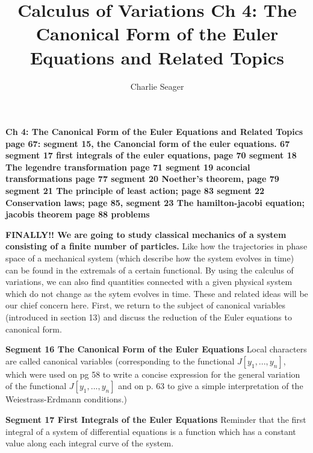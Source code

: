\documentclass{article}
\begin{document}
\title {Calculus of Variations Ch 4: The Canonical Form of the Euler Equations and Related Topics}

\author{Charlie Seager}

\maketitle

\textbf { Ch 4: The Canonical Form of the Euler Equations and Related Topics page 67: segment 15, the Canoncial form of the euler equations. 67 segment 17 first integrals of the euler equations, page 70 segment 18 The legendre transformation page 71 segment 19 aconcial transformations page 77 segment 20 Noether's theorem, page 79 segment 21 The principle of least action; page 83 segment 22 Conservation laws; page 85, segment 23 The hamilton-jacobi equation; jacobis theorem page 88 problems}

\textbf {FINALLY!! We are going to study classical mechanics of a system consisting of a finite number of particles.} Like how the trajectories in phase space of a mechanical system (which describe how the system evolves in time) can be found in the extremals of a certain functional. By using the calculus of variations, we can also find quantities connected with a given physical system which do not change as the sytem evolves in time. These and related ideas will be our chief concern here. First, we return to the subject of canonical variables (introduced in section 13) and discuss the reduction of the Euler equations to canonical form. 

\textbf {Segment 16 The Canonical Form of the Euler Equations} Local characters are called canonical variables (corresponding to the functional $J[y_1 ,..., y_n]$, which were used on pg 58 to write a concise expression for the general variation of the functional $J[y_1 ,..., y_n]$ and on p. 63 to give a simple interpretation of the Weiestrass-Erdmann conditions.)

\textbf {Segment 17 First Integrals of the Euler Equations} Reminder that the first integral of a system of differential equations is a function which has a constant value along each integral curve of the system.
\end{document}
